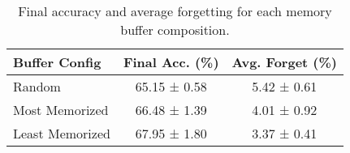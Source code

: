 \begin{table}
\caption{Final accuracy and average forgetting for each memory buffer composition.}
\label{tab:buffer-comp}
\begin{tabular}{lcc}
\toprule
Buffer Config & Final Acc. (\%) & Avg. Forget (\%) \\
\midrule
Random & 65.15 ± 0.58 & 5.42 ± 0.61 \\
Most Memorized & 66.48 ± 1.39 & 4.01 ± 0.92 \\
Least Memorized & 67.95 ± 1.80 & 3.37 ± 0.41 \\
\bottomrule
\end{tabular}
\end{table}

